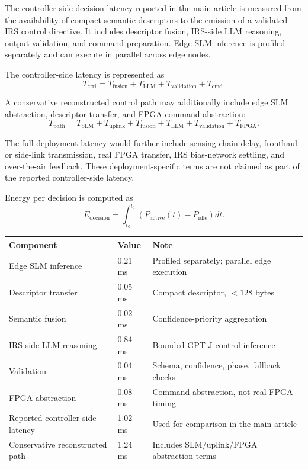 \documentclass[11pt]{article}
\begin{document}
The controller-side decision latency reported in the main article is measured from the availability of compact semantic descriptors to the emission of a validated IRS control directive. It includes descriptor fusion, IRS-side LLM reasoning, output validation, and command preparation. Edge SLM inference is profiled separately and can execute in parallel across edge nodes.

The controller-side latency is represented as
\begin{equation}
T_{\mathrm{ctrl}}=T_{\mathrm{fusion}}+T_{\mathrm{LLM}}+T_{\mathrm{validation}}+T_{\mathrm{cmd}}.
\end{equation}

A conservative reconstructed control path may additionally include edge SLM abstraction, descriptor transfer, and FPGA command abstraction:
\begin{equation}
T_{\mathrm{path}}=T_{\mathrm{SLM}}+T_{\mathrm{uplink}}+T_{\mathrm{fusion}}+T_{\mathrm{LLM}}+T_{\mathrm{validation}}+T_{\mathrm{FPGA}}.
\end{equation}

The full deployment latency would further include sensing-chain delay, fronthaul or side-link transmission, real FPGA transfer, IRS bias-network settling, and over-the-air feedback. These deployment-specific terms are not claimed as part of the reported controller-side latency.

Energy per decision is computed as
\begin{equation}
E_{\mathrm{decision}}=\int_{t_0}^{t_1}\left(P_{\mathrm{active}}(t)-P_{\mathrm{idle}}\right)dt.
\end{equation}

\begin{center}
\begin{tabular}{lll}
\toprule
Component & Value & Note \\
\midrule
Edge SLM inference & 0.21 ms & Profiled separately; parallel edge execution \\
Descriptor transfer & 0.05 ms & Compact descriptor, $<128$ bytes \\
Semantic fusion & 0.02 ms & Confidence-priority aggregation \\
IRS-side LLM reasoning & 0.84 ms & Bounded GPT-J control inference \\
Validation & 0.04 ms & Schema, confidence, phase, fallback checks \\
FPGA abstraction & 0.08 ms & Command abstraction, not real FPGA timing \\
\midrule
Reported controller-side latency & 1.02 ms & Used for comparison in the main article \\
Conservative reconstructed path & 1.24 ms & Includes SLM/uplink/FPGA abstraction terms \\
\bottomrule
\end{tabular}
\end{center}
\end{document}
